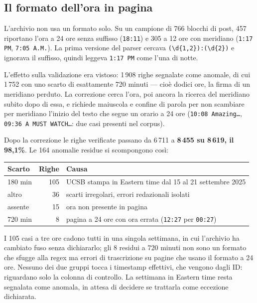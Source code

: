 \documentclass[11pt,a4paper]{article}
\begin{document}
\subsection*{Il formato dell'ora in pagina}

L'archivio non usa un formato solo. Su un campione di 766 blocchi di post, 457
riportano l'ora a 24 ore senza suffisso (\texttt{18:11}) e 305 a 12 ore con
meridiano (\texttt{1:17 PM}, \texttt{7:05 A.M.}). La prima versione del parser
cercava \verb|(\d{1,2}):(\d{2})| e ignorava il suffisso, quindi leggeva
\texttt{1:17 PM} come l'una di notte.

L'effetto sulla validazione era vistoso: 1\,908 righe segnalate come anomale,
di cui 1\,752 con uno scarto di esattamente 720 minuti — cioè dodici ore, la
firma di un meridiano perduto. La correzione cerca l'ora, poi ancora la
ricerca del meridiano subito dopo di essa, e richiede maiuscola e confine di
parola per non scambiare per meridiano l'inizio del testo che segue un orario
a 24 ore (\texttt{10:08 Amazing\dots}, \texttt{09:36 A MUST WATCH\dots}: due
casi presenti nel corpus).

Dopo la correzione le righe verificate passano da 6\,711 a \textbf{8\,455 su
8\,619, il 98,1\%}. Le 164 anomalie residue si scompongono così:

\begin{center}
\begin{tabular}{lrl}
\toprule
Scarto & Righe & Causa \\
\midrule
180 min & 105 & UCSB stampa in Eastern time dal 15 al 21 settembre 2025 \\
altro   & 36  & scarti irregolari, errori redazionali isolati \\
assente & 15  & ora non presente in pagina \\
720 min & 8   & pagina a 24 ore con ora errata (\texttt{12:27} per \texttt{00:27}) \\
\bottomrule
\end{tabular}
\end{center}

I 105 casi a tre ore cadono tutti in una singola settimana, in cui l'archivio
ha cambiato fuso senza dichiararlo; gli 8 residui a 720 minuti non sono un
formato che sfugge alla regex ma errori di trascrizione su pagine che usano il
formato a 24 ore. Nessuno dei due gruppi tocca i timestamp effettivi, che
vengono dagli ID: riguardano solo la colonna di controllo. La settimana in
Eastern time resta segnalata come anomala, in attesa di decidere se trattarla
come eccezione dichiarata.
\end{document}
